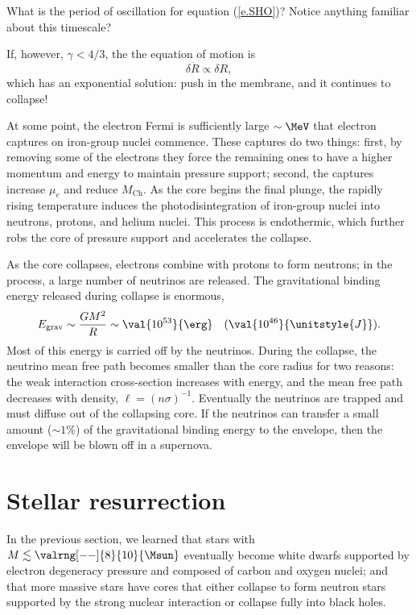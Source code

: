 \begin{sidebar}
\begin{exercisebox}
What is the period of oscillation for equation (\ref{e.SHO})?  Notice anything familiar about this timescale?
\end{exercisebox}

\noindent If, however, $\gamma < 4/3$, the the equation of motion is
\[ \delta\ddot{R} \propto \delta R, \]
which has an exponential solution: push in the membrane, and it continues to collapse!
\end{sidebar}


At some point, the electron Fermi is sufficiently large $\sim\MeV$ that electron captures on iron-group nuclei commence. These captures do two things: first, by removing some of the electrons they force the remaining ones to have a higher momentum and energy to maintain pressure support; second, the captures increase $\mu_{e}$ and reduce $M_{\mathrm{Ch}}$. As the core begins the final plunge, the rapidly rising temperature induces the photodisintegration of iron-group nuclei into neutrons, protons, and helium nuclei. This process is endothermic, which further robs the core of pressure support and accelerates the collapse.

As the core collapses, electrons combine with protons to form neutrons; in the process, a large number of neutrinos are released. The gravitational binding energy released during collapse is enormous,
\[ E_{\mathrm{grav}} \sim \frac{GM^{2}}{R} \sim \val{10^{53}}{\erg}\quad(\val{10^{46}}{\unitstyle{J}}). \]
Most of this energy is carried off by the neutrinos. During the collapse, the neutrino mean free path becomes smaller than the core radius for two reasons: the weak interaction cross-section increases with energy, and the mean free path decreases with density, $\ell = (n\sigma)^{-1}$. Eventually the neutrinos are trapped and must diffuse out of the collapsing core. If the neutrinos can transfer a small amount  ($\sim 1\%$) of the gravitational binding energy to the envelope, then the envelope will be blown off in a supernova.

\section{Stellar resurrection}
\label{s.stellar-resurrection}

In the previous section, we learned that stars with $M\lesssim\valrng[--]{8}{10}{\Msun}$ eventually become white dwarfs supported by electron degeneracy pressure and composed of carbon and oxygen nuclei; and that more massive stars have cores that either collapse to form neutron stars supported by the strong nuclear interaction or collapse fully into black holes.


